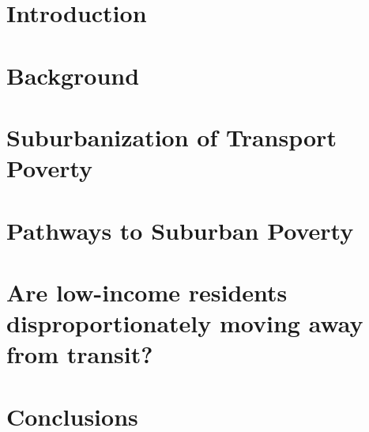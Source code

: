 \documentclass[11 pt, letterpaper]{report}
\begin{document}
\newpage


\renewcommand{\thepage}{\arabic{page}}%
\setcounter{page}{1}



\chapter{{Introduction}}


\label{ch:intro}



\chapter{Background}
\label{ch:background}




\chapter{Suburbanization of Transport Poverty}
\label{ch:subtrapov}




\chapter{Pathways to Suburban Poverty}
\label{ch:pathsubpov}




\chapter{Are low-income residents disproportionately moving away from transit?}
\label{ch:lowinctra}





\chapter{Conclusions}
\label{ch:conc}








\end{document}
